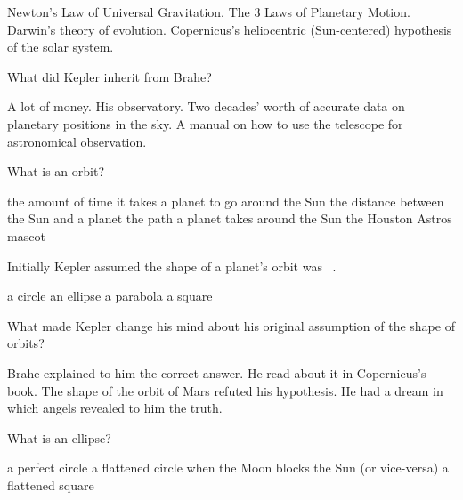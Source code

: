\documentclass[addpoints]{exam}
\begin{document}
\begin{questions}
\begin{choices}
    \choice Newton's Law of Universal Gravitation.
    \choice The 3 Laws of Planetary Motion.
    \choice Darwin's theory of evolution.
    \correctchoice Copernicus's heliocentric (Sun-centered) hypothesis of the solar system.
\end{choices}


\question
What did Kepler inherit from Brahe?

\begin{choices}
    \choice A lot of money.
    \choice His observatory.
    \correctchoice Two decades' worth of accurate data on planetary positions in the sky. 
    \choice A manual on how to use the telescope for astronomical observation.
\end{choices}

\clearpage
\question
What is an orbit?

\begin{choices}
    \choice the amount of time it takes a planet to go around the Sun
    \choice the distance between the Sun and a planet
    \correctchoice the path a planet takes around the Sun
    \choice the Houston Astros mascot
\end{choices}


\question
Initially Kepler assumed the shape of a planet's orbit was \fillin\ .

\begin{choices}
    \correctchoice a circle
    \choice an ellipse
    \choice a parabola
    \choice a square
\end{choices}

\question
What made Kepler change his mind about his original assumption of the shape of orbits?

\begin{choices}
    \choice Brahe explained to him the correct answer. 
    \choice He read about it in Copernicus's book.
    \correctchoice The shape of the orbit of Mars refuted his hypothesis.
    \choice He had a dream in which angels revealed to him the truth.
\end{choices}

\question
What is an ellipse?

\begin{choices}
    \choice a perfect circle
    \correctchoice a flattened circle
    \choice when the Moon blocks the Sun (or vice-versa)
    \choice a flattened square
\end{choices}


\end{questions}
\end{document}
